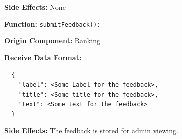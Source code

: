 \smallskip

\textbf{Side Effects:} None

\bigskip

\textbf{Function:} \verb|submitFeedback():|

\smallskip

\textbf{Origin Component:} Ranking

\smallskip

\textbf{Receive Data Format:} \begin{verbatim}
  {
    "label": <Some Label for the feedback>,
    "title": <Some title for the feedback>,
    "text": <Some text for the feedback>
  }
\end{verbatim}

\smallskip

\textbf{Side Effects:} The feedback is stored for admin viewing.

